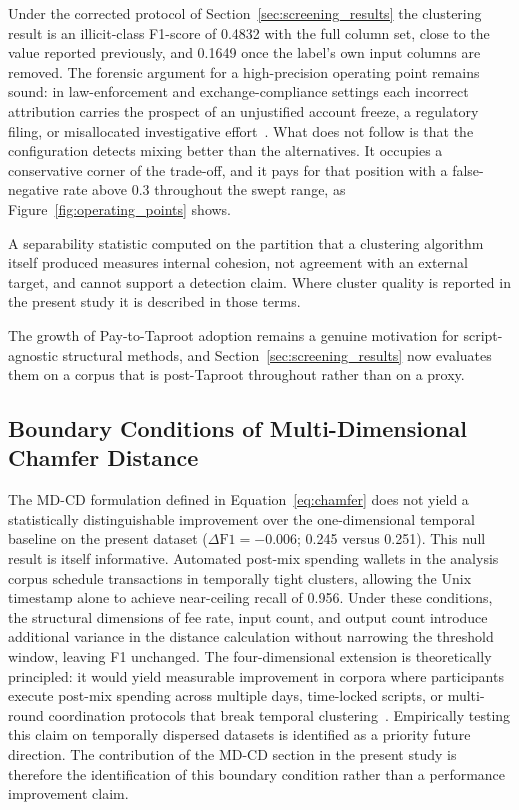 \documentclass[12pt,a4paper]{article}
\begin{document}
Under the corrected protocol of
Section~\ref{sec:screening_results} the clustering result is an
illicit-class F1-score of 0.4832 with the full column set, close
to the value reported previously, and 0.1649 once the label's own
input columns are removed. The forensic argument for a
high-precision operating point remains sound: in law-enforcement
and exchange-compliance settings each incorrect attribution
carries the prospect of an unjustified account freeze, a
regulatory filing, or misallocated investigative
effort~\citep{lee2024}. What does not follow is that the
configuration detects mixing better than the alternatives. It
occupies a conservative corner of the trade-off, and it pays for
that position with a false-negative rate above 0.3 throughout the
swept range, as Figure~\ref{fig:operating_points} shows.

A separability statistic computed on the partition that a
clustering algorithm itself produced measures internal cohesion,
not agreement with an external target, and cannot support a
detection claim. Where cluster quality is reported in the present
study it is described in those terms.

The growth of Pay-to-Taproot adoption remains a genuine motivation
for script-agnostic structural methods, and
Section~\ref{sec:screening_results} now evaluates them on a corpus
that is post-Taproot throughout rather than on a proxy.


\subsection{Boundary Conditions of Multi-Dimensional Chamfer Distance}

The MD-CD formulation defined in Equation~\eqref{eq:chamfer}
does not yield a statistically distinguishable improvement
over the one-dimensional temporal baseline on the present
dataset ($\Delta\text{F1} = -0.006$; 0.245 versus 0.251).
This null result is itself informative. Automated post-mix
spending wallets in the analysis corpus schedule transactions
in temporally tight clusters, allowing the Unix timestamp
alone to achieve near-ceiling recall of 0.956. Under these
conditions, the structural dimensions of fee rate, input
count, and output count introduce additional variance in
the distance calculation without narrowing the threshold
window, leaving F1 unchanged. The four-dimensional extension
is theoretically principled: it would yield measurable
improvement in corpora where participants execute post-mix
spending across multiple days, time-locked scripts, or
multi-round coordination protocols that break temporal
clustering~\citep{chen2025multi}. Empirically testing this
claim on temporally dispersed datasets is identified as
a priority future direction. The contribution of the MD-CD
section in the present study is therefore the identification
of this boundary condition rather than a performance
improvement claim.
\end{document}
